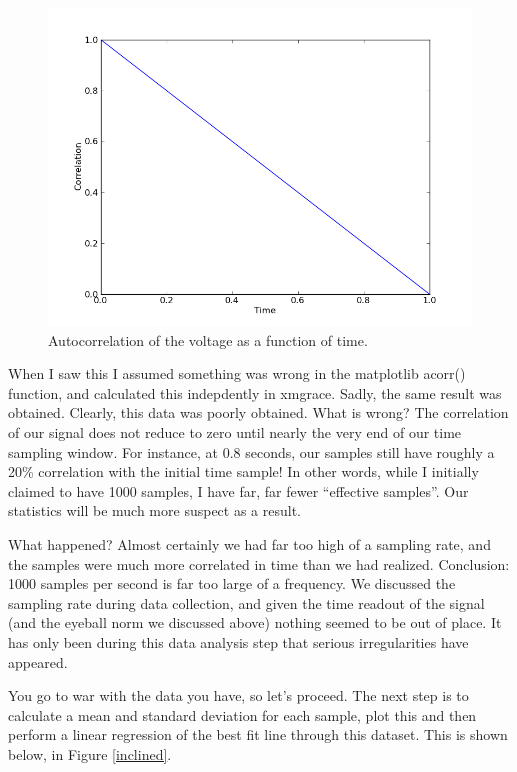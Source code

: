 \documentclass{article}
\begin{document}
  \begin{figure}[!htb]
   \begin{center}
    \includegraphics[width = 12 cm]{figs/incl_auto.png}
    \caption{Autocorrelation of the voltage as a function of time.}
    \label{incl-auto}
   \end{center}
  \end{figure}

When I saw this I assumed something was wrong in the matplotlib acorr()
function, and calculated this indepdently in xmgrace. Sadly, the same
result was obtained. Clearly, this data was poorly obtained. What is
wrong? The correlation of our signal does not reduce to zero until
nearly the very end of our time sampling window. For instance, at 0.8
seconds, our samples still have roughly a 20\% correlation with the
initial time sample! In other words, while I initially claimed to have
1000 samples, I have far, far fewer ``effective samples''. Our
statistics will be much more suspect as a result. 

What happened? Almost certainly we had far too high of a sampling
rate, and the samples were much more correlated in time than we had
realized. Conclusion: 1000 samples per second is far too large of a
frequency. We discussed the sampling rate during data collection, and
given the time readout of the signal (and the eyeball norm we discussed
above) nothing seemed to be out of place. It has only been during this
data analysis step that serious irregularities have appeared. 

You go to war with the data you have, so let's proceed. The next step is
to calculate a mean and standard deviation for each sample, plot this
and then perform a linear regression of the best fit line through this
dataset. This is shown below, in Figure \ref{inclined}. 
\end{document}
